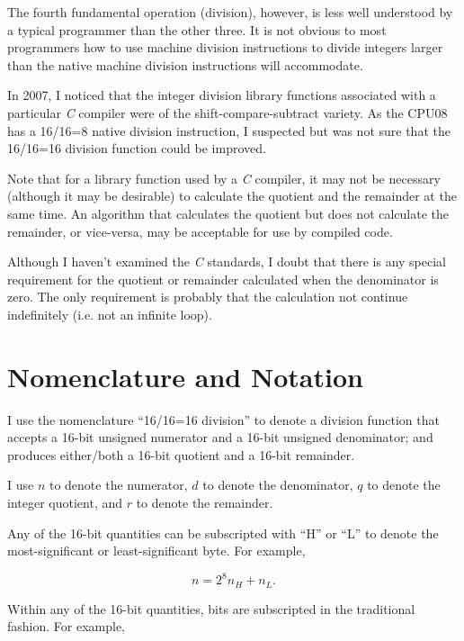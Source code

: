 \documentclass[letterpaper,10pt,titlepage]{article}
\begin{document}
The fourth fundamental operation (division), however, is less well understood
by a typical programmer than the other three.  It is not obvious to most
programmers how to use machine division instructions to divide integers larger
than the native machine division instructions will accommodate.

In 2007, I noticed that the integer division library functions associated with
a particular \emph{C} compiler were of the shift-compare-subtract variety.
As the CPU08 has a 16/16=8 native division instruction, I suspected but was not
sure that the 16/16=16 division function could be improved.

Note that for a library function used by a \emph{C} compiler, it may not
be necessary (although it may be desirable) to calculate the quotient and the
remainder at the same time.  An algorithm that calculates the quotient but
does not calculate the remainder, or vice-versa, may be acceptable for
use by compiled code. 

Although I haven't examined the \emph{C} standards, I doubt that there is
any special requirement for the quotient or remainder calculated when
the denominator is zero.  The only requirement is probably that the calculation
not continue indefinitely (i.e. not an infinite loop).


\section{Nomenclature and Notation}
\label{snom0}

I use the nomenclature ``16/16=16 division'' to denote a division function that
accepts a 16-bit unsigned numerator and a 16-bit unsigned denominator; and
produces either/both a 16-bit quotient and a 16-bit remainder.

I use $n$ to denote the numerator, $d$ to denote the denominator, $q$ to denote
the integer quotient, and $r$ to denote the remainder.

Any of the 16-bit quantities can be subscripted with ``H'' or ``L'' to denote
the most-significant or least-significant byte.  For example,

\begin{equation}
\label{eq:snom0:01}
n = 2^8 n_H + n_L .
\end{equation}

Within any of the 16-bit quantities, bits are subscripted in the traditional fashion.
For example,
\end{document}
